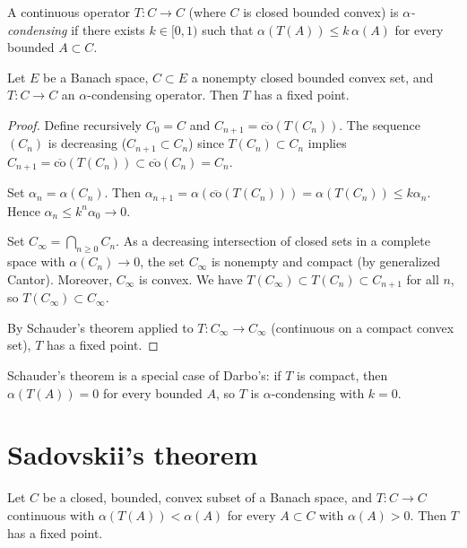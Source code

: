 \begin{definition}
A continuous operator $T : C \to C$ (where $C$ is closed bounded convex) is
\emph{$\alpha$-condensing} if there exists $k \in [0, 1)$ such that
$\alpha(T(A)) \leq k \, \alpha(A)$ for every bounded $A \subset C$.
\end{definition}

\begin{theorem}[Darbo, 1955]\label{thm:darbo}
Let $E$ be a Banach space, $C \subset E$ a nonempty closed bounded convex set,
and $T : C \to C$ an $\alpha$-condensing operator. Then $T$ has a fixed point.
\end{theorem}

\begin{proof}
Define recursively $C_0 = C$ and $C_{n+1} = \overline{\mathrm{co}}(T(C_n))$.
The sequence $(C_n)$ is decreasing ($C_{n+1} \subset C_n$) since
$T(C_n) \subset C_n$ implies
$C_{n+1} = \overline{\mathrm{co}}(T(C_n)) \subset \overline{\mathrm{co}}(C_n) = C_n$.

Set $\alpha_n = \alpha(C_n)$. Then
$\alpha_{n+1} = \alpha(\overline{\mathrm{co}}(T(C_n))) = \alpha(T(C_n)) \leq k \alpha_n$.
Hence $\alpha_n \leq k^n \alpha_0 \to 0$.

Set $C_\infty = \bigcap_{n \geq 0} C_n$. As a decreasing intersection of closed
sets in a complete space with $\alpha(C_n) \to 0$, the set $C_\infty$ is
nonempty and compact (by generalized Cantor). Moreover, $C_\infty$ is convex.
We have $T(C_\infty) \subset T(C_n) \subset C_{n+1}$ for all $n$, so
$T(C_\infty) \subset C_\infty$.

By Schauder's theorem applied to $T : C_\infty \to C_\infty$ (continuous on a
compact convex set), $T$ has a fixed point.
\end{proof}

\begin{remark}
Schauder's theorem is a special case of Darbo's: if $T$ is compact, then
$\alpha(T(A)) = 0$ for every bounded $A$, so $T$ is $\alpha$-condensing with
$k = 0$.
\end{remark}

\section{Sadovskii's theorem}

\begin{theorem}[Sadovskii, 1967]
Let $C$ be a closed, bounded, convex subset of a Banach space, and $T : C \to C$
continuous with $\alpha(T(A)) < \alpha(A)$ for every $A \subset C$ with
$\alpha(A) > 0$. Then $T$ has a fixed point.
\end{theorem}

